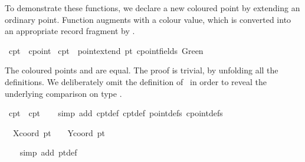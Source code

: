 \begin{isabellebody}
\begin{isamarkuptext}
  To demonstrate these functions, we declare a new coloured point by
  extending an ordinary point.  Function  augments
   with a colour value, which is converted into an
  appropriate record fragment by .%
\end{isamarkuptext}%
\isamarkuptrue%
\isamarkupfalse%
\ cpt{}\ {}{}\ cpoint\ \isanewline
{}cpt{}\ {}\ point{}extend\ pt{}\ {}cpoint{}fields\ Green{}{}%
\begin{isamarkuptext}%
The coloured points  and  are equal.  The
  proof is trivial, by unfolding all the definitions.  We deliberately
  omit the definition of~ in order to reveal the underlying
  comparison on type .%
\end{isamarkuptext}%
\isamarkuptrue%
\isamarkupfalse%
\ {}cpt{}\ {}\ cpt{}{}\isanewline
%
\isadelimproof
\ \ %
\endisadelimproof
%
\isatagproof
{}\isamarkupfalse%
\ {}simp\ add{}\ cpt{}{}def\ cpt{}{}def\ point{}defs\ cpoint{}defs{}%
\begin{isamarkuptxt}%
\begin{isabelle}%
\ {}{}\ Xcoord\ pt{}\ {}\ {}{}{}\ {}\ Ycoord\ pt{}\ {}\ {}{}%
\end{isabelle}%
\end{isamarkuptxt}%
\isamarkuptrue%
\ \ \isamarkupfalse%
\ {}simp\ add{}\ pt{}{}def{}\isanewline

\end{isabellebody}
